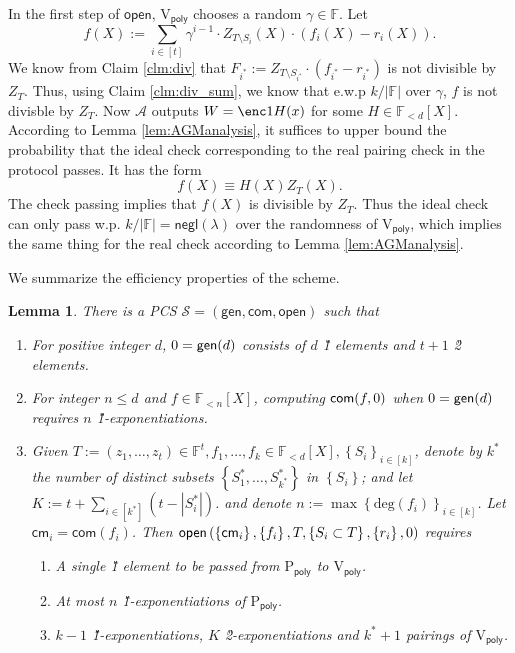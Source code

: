 \documentclass[11pt]{article} %
\newcommand{\F}{\ensuremath{\mathbb F}\xspace}
\newcommand{\adv}{\ensuremath{\mathcal A}\xspace}
\newcommand{\com}{\ensuremath{\mathsf{com}}\xspace}
\newcommand{\cm}{\ensuremath{\mathsf{cm}}\xspace}
\newcommand{\open}{\ensuremath{\mathsf{open}}\xspace}
\renewcommand{\deg}{\ensuremath{\mathrm{deg}}\xspace}
\newcommand{\negl}{\ensuremath{\mathsf{negl}(\lambda)}\xspace}
\newcommand{\defeq}{:=}
\newcommand{\sett}[2]{\ensuremath{\set{#1}_{#2}}\xspace}
\newcommand{\gen}{\ensuremath{\mathsf{gen}}\xspace}
\newcommand{\prvpoly}{\ensuremath{\mathrm{P_{\mathsf{poly}}}}\xspace}
\newcommand{\verpoly}{\ensuremath{\mathrm{V_{\mathsf{poly}}}}\xspace}
\newcommand{\set}[1]{\ensuremath{\left\{#1\right\}}\xspace}
\newcommand{\polysofdeg}[1]{\ensuremath{\F_{< #1}[X]}\xspace}
\newcommand{\PCscheme}{\ensuremath{\mathscr{S}}\xspace}
\newcommand{\sumi}[1]{\sum_{i\in[#1]}}
\newtheorem{lemma}{Lemma}[section]
\begin{document}
\begin{enumerate}
 In the first step of \open, \verpoly chooses a random $\gamma \in \F$.
 Let
 \[f(X)\defeq \sum_{i\in [t]} \gamma^{i-1} \cdot Z_{T\setminus S_i}(X)\cdot (f_i(X)-r_i(X)).\]
 We know from Claim \ref{clm:div} that $F_{i^*} \defeq  Z_{T\setminus S_{i^*}}\cdot (f_{i^*}-r_{i^*})$ is not divisible by $Z_T$. Thus, using Claim \ref{clm:div_sum}, we know that e.w.p $k/|\F|$ over $\gamma$, $f$ is not divisble by $Z_T$.
  Now \adv outputs $W=\enc1{H(x)}$ for some $H\in\polysofdeg{d}$.
 According to Lemma \ref{lem:AGManalysis}, it suffices to upper bound the probability that the ideal check corresponding to the real pairing check in the protocol passes. It has the form
 \[f(X) \equiv H(X)Z_T(X).\]
 The check passing implies that
 $f(X)$ is divisible by $Z_T$. Thus the ideal check can only pass w.p. $k/|\F|= \negl$ over the randomness of \verpoly, which implies the same thing for the real check according to Lemma \ref{lem:AGManalysis}.


 \end{enumerate}



 We summarize the efficiency properties of the scheme.

 \begin{lemma}\label{lem:multikate}
  There is a PCS $\PCscheme=(\gen,\com,\open)$ such that
  \begin{enumerate}
\item For positive integer $d$, $\srs0=\gen(d)$ consists of $d$ \G1 elements and $t+1$ \G2 elements.
  \item For integer $n\leq d$ and $f\in \polysofdeg{n}$, computing $\com(f,\srs0)$ when $\srs0=\gen(d)$ requires $n$ \G1-exponentiations.
   \item Given $T \defeq (z_1,\ldots,z_t)\in \F^t, f_1,\ldots, f_k \in \polysofdeg{d}, \sett{S_i}{i\in [k]}$, denote by $k^*$ the number of distinct subsets  \set{S^*_1,\ldots,S^*_{k^*}} in \set{S_i}; and
   let $K\defeq t+ \sumi {k^*}\left( t-|S^*_i|\right)$.
   and denote $n \defeq \max\sett{\deg(f_i)}{i\in [k]}$.
   Let $\cm_i = \com(f_i)$.
   Then $\open\left(\set{\cm_i},\set{f_i},T,\set{S_i\subset T},\set{r_i},\srs0 \right)$ requires
   \begin{enumerate}
    \item A single \G1 element to be passed from \prvpoly to \verpoly.
    \item At most $n$ \G1-exponentiations of \prvpoly.
    \item $k-1$ \G1-exponentiations, $K$ \G2-exponentiations and $k^*+1$ pairings of \verpoly.
   \end{enumerate}
\end{enumerate}

\end{lemma}
\end{document}
